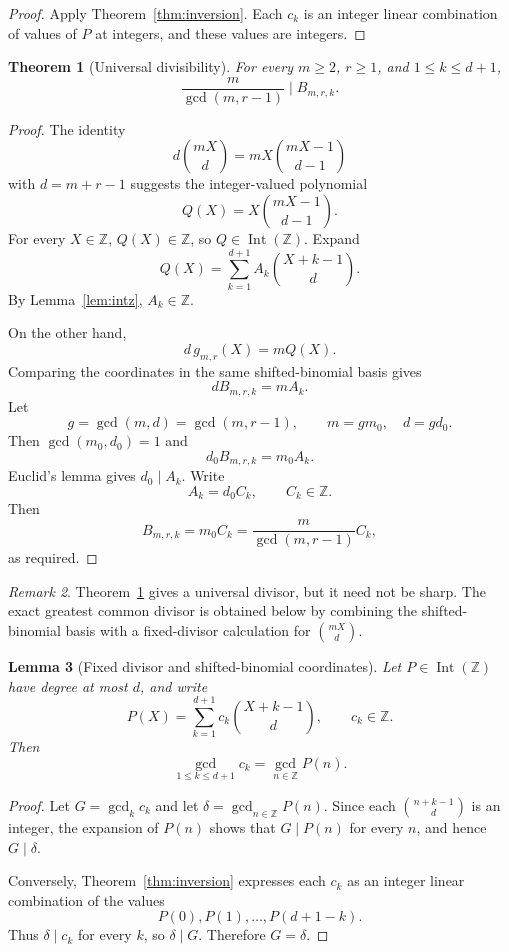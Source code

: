 \documentclass[11pt]{article}
\newtheorem{theorem}{Theorem}[section]
\newtheorem{lemma}[theorem]{Lemma}
\theoremstyle{definition}
\theoremstyle{remark}
\newtheorem{remark}[theorem]{Remark}
\newcommand{\Z}{\mathbb Z}
\newcommand{\Int}{\operatorname{Int}}
\begin{document}
\begin{proof}
Apply Theorem~\ref{thm:inversion}. Each $c_k$ is an integer linear
combination of values of $P$ at integers, and these values are integers.
\end{proof}

\begin{theorem}[Universal divisibility]
\label{thm:div}
For every $m\ge2$, $r\ge1$, and $1\le k\le d+1$,
\[
 \frac{m}{\gcd(m,r-1)}\mid B_{m,r,k}.
\]
\end{theorem}

\begin{proof}
The identity
\[
 d\binom{mX}{d}
 =
 mX\binom{mX-1}{d-1}
\]
with $d=m+r-1$ suggests the integer-valued polynomial
\[
 Q(X)=X\binom{mX-1}{d-1}.
\]
For every $X\in\Z$, $Q(X)\in\Z$, so $Q\in\Int(\Z)$. Expand
\[
 Q(X)=\sum_{k=1}^{d+1}A_k\binom{X+k-1}{d}.
\]
By Lemma~\ref{lem:intz}, $A_k\in\Z$.

On the other hand,
\[
 d\,g_{m,r}(X)=mQ(X).
\]
Comparing the coordinates in the same shifted-binomial basis gives
\[
 dB_{m,r,k}=mA_k.
\]
Let
\[
 g=\gcd(m,d)=\gcd(m,r-1),
 \qquad
 m=gm_0,\quad d=gd_0.
\]
Then $\gcd(m_0,d_0)=1$ and
\[
 d_0B_{m,r,k}=m_0A_k.
\]
Euclid's lemma gives $d_0\mid A_k$. Write
\[
 A_k=d_0C_k,\qquad C_k\in\Z.
\]
Then
\[
 B_{m,r,k}=m_0C_k
 =\frac{m}{\gcd(m,r-1)}C_k,
\]
as required.
\end{proof}

\begin{remark}
Theorem~\ref{thm:div} gives a universal divisor, but it need not be sharp.
The exact greatest common divisor is obtained below by combining the
shifted-binomial basis with a fixed-divisor calculation for
$\binom{mX}{d}$.
\end{remark}

\begin{lemma}[Fixed divisor and shifted-binomial coordinates]
\label{lem:fixed-divisor}
Let $P\in\Int(\Z)$ have degree at most $d$, and write
\[
 P(X)=\sum_{k=1}^{d+1}c_k\binom{X+k-1}{d},
 \qquad c_k\in\Z.
\]
Then
\[
 \gcd_{1\le k\le d+1}c_k
 =
 \gcd_{n\in\Z}P(n).
\]
\end{lemma}

\begin{proof}
Let $G=\gcd_k c_k$ and let $\delta=\gcd_{n\in\Z}P(n)$.
Since each $\binom{n+k-1}{d}$ is an integer, the expansion of $P(n)$
shows that $G\mid P(n)$ for every $n$, and hence $G\mid\delta$.

Conversely, Theorem~\ref{thm:inversion} expresses each $c_k$ as an
integer linear combination of the values
\[
 P(0),P(1),\ldots,P(d+1-k).
\]
Thus $\delta\mid c_k$ for every $k$, so $\delta\mid G$. Therefore
$G=\delta$.
\end{proof}
\end{document}
